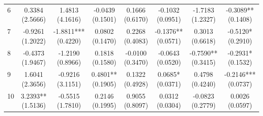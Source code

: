 \begin{table}[!htbp]
\begin{threeparttable}
\begin{tabular}{@{}lccccccc@{}}
6 & \shortstack{0.3384\\(2.5666)} & \shortstack{1.4813\\(4.1616)} & \shortstack{-0.0439\\(0.1501)} & \shortstack{0.1666\\(0.6170)} & \shortstack{-0.1032\\(0.0951)} & \shortstack{-1.7183\\(1.2327)} & \shortstack{-0.3089**\\(0.1408)} \\
7 & \shortstack{-0.9261\\(1.2022)} & \shortstack{-1.8811***\\(0.4220)} & \shortstack{0.0802\\(0.1470)} & \shortstack{0.2268\\(0.4083)} & \shortstack{-0.1376**\\(0.0571)} & \shortstack{0.3013\\(0.6618)} & \shortstack{-0.5120*\\(0.2910)} \\
8 & \shortstack{-0.4373\\(1.9467)} & \shortstack{-1.2190\\(0.8966)} & \shortstack{0.1818\\(0.1580)} & \shortstack{-0.0100\\(0.3470)} & \shortstack{-0.0643\\(0.0520)} & \shortstack{-0.7590**\\(0.3415)} & \shortstack{-0.2931*\\(0.1532)} \\
9 & \shortstack{1.6041\\(2.3656)} & \shortstack{-0.9216\\(3.1151)} & \shortstack{0.4801**\\(0.1905)} & \shortstack{0.1322\\(0.4928)} & \shortstack{0.0685*\\(0.0371)} & \shortstack{0.4798\\(0.4240)} & \shortstack{-0.2146***\\(0.0737)} \\
10 & \shortstack{3.2393**\\(1.5136)} & \shortstack{-0.5515\\(1.7810)} & \shortstack{0.2146\\(0.1995)} & \shortstack{0.9055\\(0.8097)} & \shortstack{0.0312\\(0.0304)} & \shortstack{-0.0823\\(0.2779)} & \shortstack{0.0026\\(0.0597)} \\

\end{tabular}
\end{threeparttable}
\end{table}
